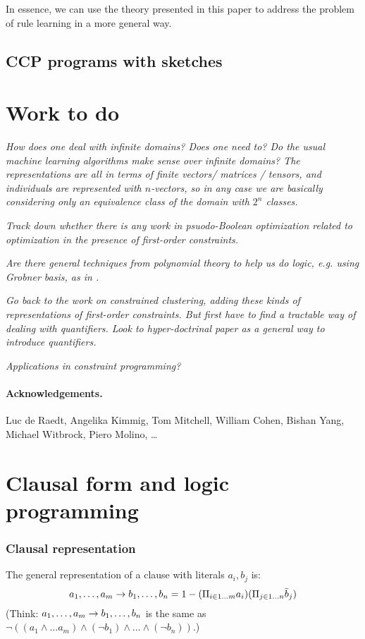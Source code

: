 \documentclass{article} %
\begin{document}
In essence, we can use the theory presented in this paper to address the problem of rule learning in a more general way.

\subsection{CCP programs with sketches}

\section{Work to do}

{\em How does one deal with infinite domains? Does one need to? Do the
usual machine learning algorithms make sense over infinite domains?
The representations are all in terms of finite vectors/ matrices /
tensors, and individuals are represented with $n$-vectors, so in any
case we are basically considering only an equivalence class of the
domain with $2^n$ classes.}

{\em Track down whether there is any work in psuodo-Boolean
  optimization related to optimization in the presence of first-order
  constraints.
}

{\em Are there general techniques from polynomial theory to help us do
  logic, e.g. using Grobner basis, as in \cite{Brickenstein:2009:PFG:1550968.1551286}.}

{\em Go back to the work on constrained clustering, adding these kinds
of representations of first-order constraints. But first have to find
a tractable way of dealing with quantifiers. Look to hyper-doctrinal paper as a general 
way to introduce quantifiers.}

{\em Applications in constraint programming?}

\paragraph{Acknowledgements.} Luc de Raedt, Angelika Kimmig, Tom Mitchell, William Cohen, Bishan Yang, Michael Witbrock, Piero Molino, \ldots




\appendix

\section{Clausal form and logic programming}
\subsubsection{Clausal representation}
The general representation of a clause with literals $a_i,b_j$ is:
\begin{equation}
a_1,\ldots, a_m \rightarrow b_1, \ldots, b_n = 1-(\Pi_{i \in 1\ldots m} a_i)  (\Pi_{j\in 1\ldots n} \bar{b}_j)
\end{equation}
\noindent (Think: $a_1,\ldots, a_m \rightarrow b_1, \ldots, b_n$ is the same as $\neg ((a_1 \wedge \ldots a_m)
\wedge (\neg b_1) \wedge \ldots \wedge (\neg b_n))$.)
\end{document}
